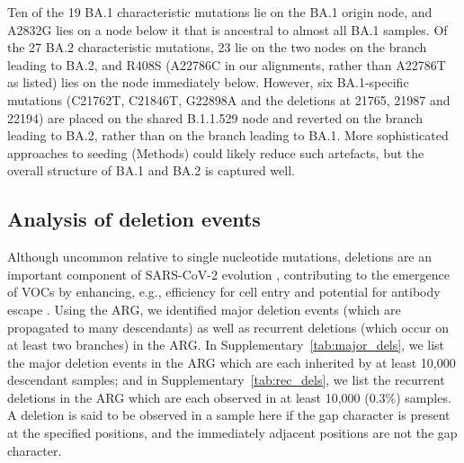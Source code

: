 \documentclass[12pt]{article}
\newcommand{\siref}[1]{Supplementary~\ref{#1}}
\begin{document}
Ten of the 19 BA.1 characteristic mutations lie on the BA.1 origin node,
and A2832G lies on a node below it that is ancestral to almost all BA.1 samples.
Of the 27 BA.2 characteristic mutations,
23 lie on the two nodes on the branch leading to BA.2,
and R408S (A22786C in our alignments, rather than A22786T as listed)
lies on the node immediately below.
However, six BA.1-specific mutations
(C21762T, C21846T, G22898A and the deletions at 21765, 21987 and 22194)
are placed on the shared B.1.1.529 node
and reverted on the branch leading to BA.2,
rather than on the branch leading to BA.1.
More sophisticated approaches to seeding (Methods) could likely reduce
such artefacts, but the overall structure of BA.1 and BA.2 is captured well.


\subsection{Analysis of deletion events}
\label{sec:supplement_dels}

Although uncommon relative to single nucleotide mutations,
deletions are an important component of
SARS-CoV-2 evolution \cite{Jeronimo2023},
contributing to the emergence of VOCs by enhancing,
e.g., efficiency for cell entry \cite{Cantoni2022} and
potential for antibody escape \cite{McCarthy2021}.
Using the ARG, we identified major deletion events
(which are propagated to many descendants)
as well as recurrent deletions
(which occur on at least two branches) in the ARG.
In \siref{tab:major_dels},
we list the major deletion events in the ARG
which are each inherited by at least 10,000 descendant samples; and
in \siref{tab:rec_dels},
we list the recurrent deletions in the ARG
which are each observed in at least 10,000 (0.3\%) samples.
A deletion is said to be observed in a sample here
if the gap character is present at the specified positions,
and the immediately adjacent positions are not the gap
character.
\end{document}
